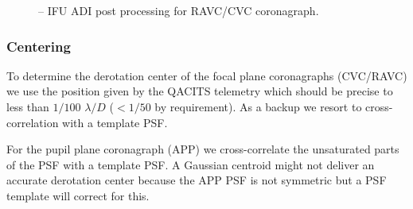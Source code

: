 \begin{figure}[hb]
  \centering
  \def \globalscale {0.400000}
  \fontsize{10}{12}\selectfont
  
  \caption[Recipe: ]{ -- IFU ADI post processing for RAVC/CVC coronagraph.
    }
  \label{fig:metis_ifu_adi_cgrph}
\end{figure}
\restoregeometry

\subsubsection{Centering}

To determine the derotation center of the focal plane coronagraphs (CVC/RAVC) we use the position given by the QACITS telemetry which should be precise to less than $1/100$ $\lambda/D$ ($<1/50$ by requirement). As a backup we resort to cross-correlation with a template PSF.

For the pupil plane coronagraph (APP) we cross-correlate the unsaturated parts of the PSF with a template PSF. A Gaussian centroid might not deliver an accurate derotation center because the APP PSF is not symmetric but a PSF template will correct for this.

